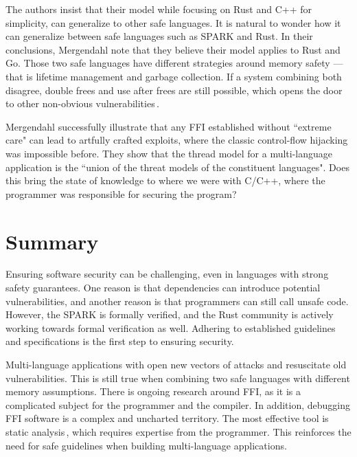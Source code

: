 \documentclass[nomenclature, english, bibtex]{kththesis}
\begin{document}
The authors insist that their model while focusing on Rust and C++ for simplicity, can generalize to other safe languages. It is natural to wonder how it can generalize between safe languages such as SPARK and Rust. In their conclusions, Mergendahl \etal note that they believe their model applies to Rust and Go. Those two safe languages have different strategies around memory safety --- that is lifetime management and garbage collection. If a system combining both disagree, double frees and use after frees are still possible, which opens the door to other non-obvious vulnerabilities\,\cite{mergendahl_cross-language_2022}.

Mergendahl \etal successfully illustrate that any FFI established without ``extreme care"\cite{mergendahl_cross-language_2022} can lead to artfully crafted exploits, where the classic control-flow hijacking was impossible before. They show that the thread model for a multi-language application is the ``union of the threat models of the constituent languages"\cite{mergendahl_cross-language_2022}. Does this bring the state of knowledge to where we were with C/C++, where the programmer was responsible for securing the program?

\section{Summary}

Ensuring software security can be challenging, even in languages with strong safety guarantees. One reason is that dependencies can introduce potential vulnerabilities, and another reason is that programmers can still call unsafe code. However, the SPARK is formally verified, and the Rust community is actively working towards formal verification as well. Adhering to established guidelines and specifications is the first step to ensuring security.

Multi-language applications with  open new vectors of attacks and resuscitate old vulnerabilities. This is still true when combining two safe languages with different memory assumptions. 
There is ongoing research around FFI, as it is a complicated subject for the programmer and the compiler. In addition, debugging FFI software is a complex and uncharted territory. The most effective tool is static analysis\,\cite{li_improving_2014}, which requires expertise from the programmer.
This reinforces the need for safe guidelines when building multi-language applications.


\cleardoublepage
\end{document}
